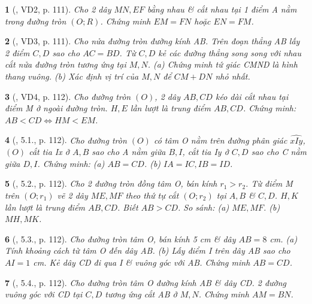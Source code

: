 \documentclass{article}
\newtheorem{baitoan}{}
\begin{document}
\begin{baitoan}[\cite{Binh_boi_duong_Toan_9_tap_1}, VD2, p. 111]
	Cho 2 dây $MN,EF$ bằng nhau \& cắt nhau tại 1 điểm A nằm trong đường tròn $(O;R)$. Chứng minh $EM = FN$ hoặc $EN = FM$.
\end{baitoan}

\begin{baitoan}[\cite{Binh_boi_duong_Toan_9_tap_1}, VD3, p. 111]
	Cho nửa đường tròn đường kính AB. Trên đoạn thẳng AB lấy 2 điểm $C,D$ sao cho $AC = BD$. Từ $C,D$ kẻ các đường thẳng song song với nhau cắt nửa đường tròn tương ứng tại $M,N$. (a) Chứng minh tứ giác CMND là hình thang vuông. (b) Xác định vị trí của $M,N$ để $CM + DN$ nhỏ nhất.
\end{baitoan}

\begin{baitoan}[\cite{Binh_boi_duong_Toan_9_tap_1}, VD4, p. 112]
	Cho đường tròn $(O)$, 2 dây $AB,CD$ kéo dài cắt nhau tại điểm M ở ngoài đường tròn. $H,E$ lần lượt là trung điểm $AB,CD$. Chứng minh: $AB < CD\Leftrightarrow HM < EM$.
\end{baitoan}

\begin{baitoan}[\cite{Binh_boi_duong_Toan_9_tap_1}, 5.1., p. 112]
	Cho đường tròn $(O)$ có tâm O nằm trên đường phân giác $\widehat{xIy}$, $(O)$ cắt tia Ix ở $A,B$ sao cho A nằm giữa $B,I$, cắt tia Iy ở $C,D$ sao cho C nằm giữa $D,I$. Chứng minh: (a) $AB = CD$. (b) $IA = IC,IB = ID$.
\end{baitoan}

\begin{baitoan}[\cite{Binh_boi_duong_Toan_9_tap_1}, 5.2., p. 112]
	Cho 2 đường tròn đồng tâm O, bán kính $r_1 > r_2$. Từ điểm M trên $(O;r_1)$ vẽ 2 dây $ME,MF$ theo thứ tự cắt $(O;r_2)$ tại $A,B$ \& $C,D$. $H,K$ lần lượt là trung điểm $AB,CD$. Biết $AB > CD$. So sánh: (a) $ME,MF$. (b) $MH,MK$.
\end{baitoan}

\begin{baitoan}[\cite{Binh_boi_duong_Toan_9_tap_1}, 5.3., p. 112]
	Cho đường tròn tâm O, bán kính {\rm5 cm} \& dây $AB = 8$ {\rm cm}. (a) Tính khoảng cách từ tâm O đến dây AB. (b) Lấy điểm I trên dây AB sao cho $AI = 1$ {\rm cm}. Kẻ dây CD đi qua I \& vuông góc với AB. Chứng minh $AB = CD$.
\end{baitoan}

\begin{baitoan}[\cite{Binh_boi_duong_Toan_9_tap_1}, 5.4., p. 112]
	Cho đường tròn tâm O đường kính AB \& dây CD. 2 đường vuông góc với CD tại $C,D$ tương ứng cắt AB ở $M,N$. Chứng minh $AM = BN$.
\end{baitoan}
\end{document}
